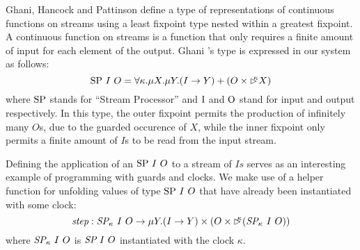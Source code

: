 Ghani, Hancock and Pattinson \cite{streameating} define a type of
representations of continuous functions on streams using a least
fixpoint type nested within a greatest fixpoint. A continuous function
on streams is a function that only requires a finite amount of input
for each element of the output. Ghani \etal's type is expressed in our
system as follows:
\begin{displaymath}
  \textrm{SP}~I~O = \forall \kappa. \mu X. \mu Y. (I \to Y) + (O \times \mathord{\rhd\kern-0.4em^{\kappa}} X)
\end{displaymath}
where $\textrm{SP}$ stands for ``Stream Processor'' and $\textrm{I}$
and $\textrm{O}$ stand for input and output respectively. In this
type, the outer fixpoint permits the production of infinitely many
$O$s, due to the guarded occurence of $X$, while the inner fixpoint
only permits a finite amount of $I$s to be read from the input stream.

Defining the application of an $\textrm{SP}~I~O$ to a stream of $Is$
serves as an interesting example of programming with guards and
clocks. We make use of a helper function for unfolding values of type
$\textrm{SP}~I~O$ that have already been instantiated with some clock:
\begin{displaymath}
  \textit{step} : \textit{SP}_\kappa~I~O \to \mu Y. (I \to Y) \times (O \times \mathord{\rhd\kern-0.4em^{\kappa}}(\textit{SP}_\kappa~I~O))
\end{displaymath}
where $\textit{SP}_\kappa~I~O$ is $\textit{SP}~I~O$ instantiated with
the clock $\kappa$.

